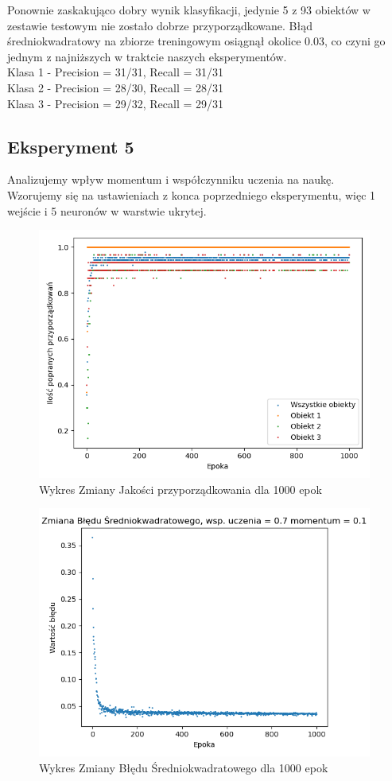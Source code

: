\documentclass[12pt]{article}
\begin{document}
Ponownie zaskakująco dobry wynik klasyfikacji, jedynie 5 z 93 obiektów w zestawie testowym nie zostało dobrze przyporządkowane. Błąd średniokwadratowy na zbiorze treningowym osiągnął okolice 0.03, co czyni go jednym z najniższych w traktcie naszych eksperymentów.
\\Klasa 1 - Precision = 31/31, Recall = 31/31\\
Klasa 2 - Precision = 28/30, Recall = 28/31\\
Klasa 3 - Precision = 29/32, Recall = 29/31\\
\newpage
\subsection {Eksperyment 5}

Analizujemy wpływ momentum i współczynniku uczenia na naukę.\\ Wzorujemy się na ustawieniach z konca poprzedniego eksperymentu, więc 1 wejście i 5 neuronów w warstwie ukrytej.

\begin{figure}[!ht]
 \centering
 \includegraphics[width=11cm]{Wykreswspuczenia.png}
 \caption{Wykres Zmiany Jakości przyporządkowania dla 1000 epok}
 \vspace{-0.1cm}
 \label{WykresPrzyp20}
\end{figure}

\newpage

\begin{figure}[!ht]
 \centering
 \includegraphics[width=11cm]{bladwspUczenia.png}
 \caption{Wykres Zmiany Błędu Średniokwadratowego dla 1000 epok}
 \vspace{-0.1cm}
 \label{WykresBlad20}
\end{figure}
\end{document}
